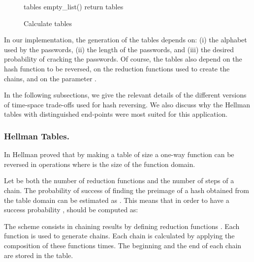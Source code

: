 \documentclass{llncs}
\begin{document}
\begin{figure} [ht]
\vspace{-0.5 cm}
\begin{algorithm}[H]
  \caption{Calculate tables}
\label{algo:tables_calculation}\DontPrintSemicolon

  \KwIn{}


  tables  empty\_list() \;
  return tables \;
\end{algorithm}
\vspace{-0.5 cm}
\end{figure}


In our implementation, the generation of the tables depends on:
(i) the alphabet used by the passwords, 
(ii) the length of the passwords,
and (iii) the desired probability  of cracking the passwords.
Of course, the tables also depend on the hash function  to be reversed,
on the reduction functions used to create the chains,
and on the parameter .


In the following subsections, we give the relevant details 
of the different versions of time-space trade-offs used for hash reversing.
We also discuss why the Hellman tables with distinguished end-points
were most suited for this application.


\subsubsection{Hellman Tables.}

In \cite{paper:h-80} Hellman proved that by making a table
of size  a one-way function  
can be reversed in 
operations where  is the size of the function domain.

Let  be both the number of reduction functions and the
number of steps of a chain. The probability of success of finding the preimage
of a hash obtained from the table domain can be estimated as 
 \cite{paper:o-03}. 
This means that in order to have a success probability
,  should be computed as: 


The scheme consists in chaining  results by defining 
reduction functions .
Each function  is used to generate
 chains. Each chain is calculated by applying the composition
of these functions  times. The beginning and the end of
each chain are stored in the table.
\end{document}
